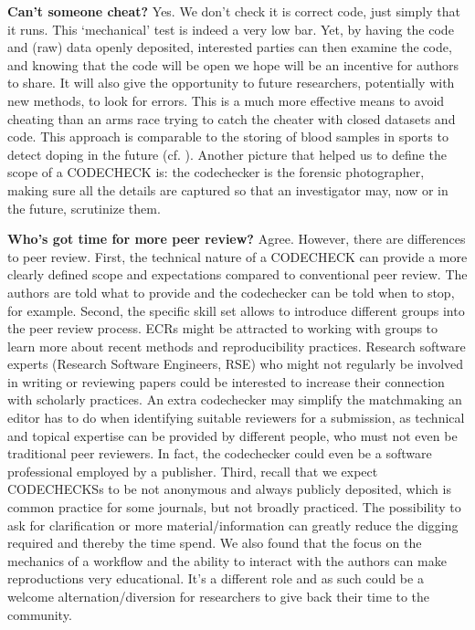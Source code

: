 \documentclass[12pt]{article}
\begin{document}
\textbf{Can't someone cheat?} Yes. We don't check it is correct code,
just simply that it runs. This `mechanical' test is indeed a very low bar.
Yet, by having the code and (raw) data openly deposited, interested parties can
then examine the code, and knowing that the code will be open we hope will
be an incentive for authors to share. It will also give the opportunity 
to future researchers, potentially with new methods, to look for errors.
This is a much more effective means to avoid cheating than an arms race
trying to catch the cheater with closed datasets and code. This approach
is comparable to the storing of blood samples in sports to detect
doping in the future (cf. \cite{everythinghertz97}).
Another picture that helped us to define the scope of a CODECHECK is:
the codechecker is the forensic photographer, making sure all the details
are captured so that an investigator may, now or in the future, scrutinize
them.

\textbf{Who's got time for more peer review?} Agree.
However, there are differences to peer review.
First, the technical nature of a CODECHECK can provide a more 
clearly defined scope and expectations compared to conventional 
peer review. The authors are told what to provide and the codechecker
can be told when to stop, for example.
Second, the specific skill set allows to introduce different groups
into the peer review process. ECRs might be attracted to working with
groups to learn more about recent methods and reproducibility practices.
Research software experts (Research Software Engineers, RSE) who might
not regularly be involved in writing or reviewing papers could be 
interested to increase their connection with scholarly practices.
An extra codechecker may simplify the matchmaking an editor has to do
when identifying suitable reviewers for a submission, as technical and
topical expertise can be provided by different people, who must not even
be traditional peer reviewers. In fact, the codechecker could even be
a software professional employed by a publisher.
Third, recall that we expect CODECHECKSs to be not anonymous and always
publicly deposited, which is common practice for some journals, but not
broadly practiced. The possibility to ask for clarification or more 
material/information can greatly reduce the digging required and thereby
the time spend.
We also found that the focus on the mechanics of a
workflow and the ability to interact with the authors can make
reproductions very educational. It's a different role and as such could
be a welcome alternation/diversion for researchers to give back their 
time to the community.
\end{document}
